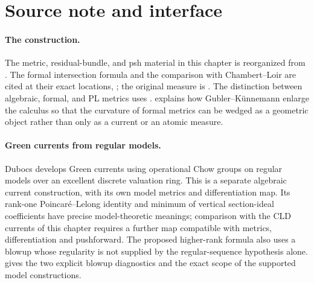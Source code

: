 \section{Source note and interface}
\label{sec:ch17-source-note}

\paragraph{The construction.}
The metric, residual-bundle, and psh material in this chapter is reorganized
from \cite[Chapters~17--18]{CLD25}.  The formal intersection formula and the
comparison with Chambert--Loir are cited at their exact locations,
\cite[Theorem~18.5.5 and Proposition~18.5.8]{CLD25}; the original measure is
\cite{CL06}.  The distinction between algebraic, formal, and PL metrics uses
\cite{GM19}.   explains how Gubler--K\"unnemann
enlarge the calculus so that the curvature of formal metrics can be wedged
as a geometric object rather than only as a current or an atomic measure.

\paragraph{Green currents from regular models.}
Dubocs \cite{Dubocs26GreenV1} develops Green currents using operational
Chow groups on regular models over an excellent discrete valuation ring.
This is a separate algebraic current construction, with its own
model metrics and differentiation map. Its rank-one
Poincar\'e--Lelong identity and minimum of vertical section-ideal
coefficients have precise model-theoretic meanings; comparison with the
CLD currents of this chapter requires a further map compatible with
metrics, differentiation and pushforward. The proposed higher-rank
formula also uses a blowup whose regularity is not supplied by the
regular-sequence hypothesis alone.
 gives the two explicit blowup
diagnostics and the exact scope of the supported model constructions.


